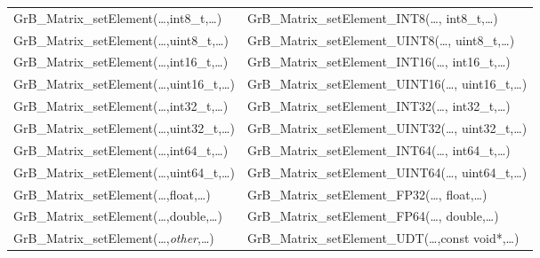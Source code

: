 \begin{table}[htb]
{\begin{tabular}{l|l}
{\sf GrB\_Matrix\_setElement(\ldots,int8\_t,\ldots)}		& {\sf GrB\_Matrix\_setElement\_INT8(\ldots, int8\_t,\ldots)} \\
{\sf GrB\_Matrix\_setElement(\ldots,uint8\_t,\ldots)}		& {\sf GrB\_Matrix\_setElement\_UINT8(\ldots, uint8\_t,\ldots)} \\
{\sf GrB\_Matrix\_setElement(\ldots,int16\_t,\ldots)}		& {\sf GrB\_Matrix\_setElement\_INT16(\ldots, int16\_t,\ldots)} \\
{\sf GrB\_Matrix\_setElement(\ldots,uint16\_t,\ldots)}		& {\sf GrB\_Matrix\_setElement\_UINT16(\ldots, uint16\_t,\ldots)} \\
{\sf GrB\_Matrix\_setElement(\ldots,int32\_t,\ldots)}		& {\sf GrB\_Matrix\_setElement\_INT32(\ldots, int32\_t,\ldots)} \\
{\sf GrB\_Matrix\_setElement(\ldots,uint32\_t,\ldots)}		& {\sf GrB\_Matrix\_setElement\_UINT32(\ldots, uint32\_t,\ldots)} \\
{\sf GrB\_Matrix\_setElement(\ldots,int64\_t,\ldots)}		& {\sf GrB\_Matrix\_setElement\_INT64(\ldots, int64\_t,\ldots)} \\
{\sf GrB\_Matrix\_setElement(\ldots,uint64\_t,\ldots)}		& {\sf GrB\_Matrix\_setElement\_UINT64(\ldots, uint64\_t,\ldots)} \\
{\sf GrB\_Matrix\_setElement(\ldots,float,\ldots)}		& {\sf GrB\_Matrix\_setElement\_FP32(\ldots, float,\ldots)} \\
{\sf GrB\_Matrix\_setElement(\ldots,double,\ldots)}		& {\sf GrB\_Matrix\_setElement\_FP64(\ldots, double,\ldots)} \\
{\sf GrB\_Matrix\_setElement(\ldots,\emph{other},\ldots)}	& {\sf GrB\_Matrix\_setElement\_UDT(\ldots,const void*,\ldots)} \\


\end{tabular}}
\end{table}
